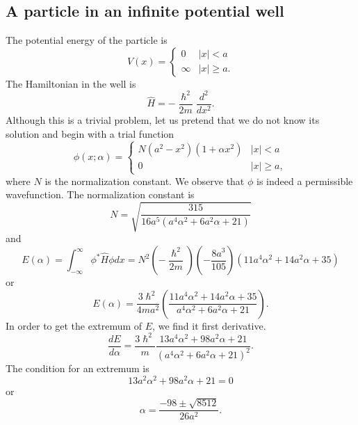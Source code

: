 \documentclass{article}
\numberwithin{equation}{section}
\begin{document}
\subsection{A particle in an infinite potential well}
The potential energy of the particle is
\begin{equation}\label{s5e12}
V(x) = \begin{cases}
0 & |x| < a \\
\infty & |x| \ge a.
\end{cases}
\end{equation}
The Hamiltonian in the well is
\begin{equation}\label{s5e13}
\hat{H} = -\frac{\hslash^2}{2m}\frac{d^2}{dx^2}.
\end{equation}
Although this is a trivial problem, let us pretend that we do not know
its solution and begin with a trial function
\begin{equation}\label{s5e14}
\phi(x;\alpha) = \begin{cases}
N(a^2 - x^2)(1 + \alpha x^2) & |x| < a \\
0 & |x| \ge a,
\end{cases}
\end{equation}
where $N$ is the normalization constant. We observe that $\phi$ is indeed a 
permissible wavefunction. The normalization constant is
\begin{equation}\label{s5e15}
N = \sqrt{\frac{315}{16 a^5(a^4\alpha^2 + 6a^2\alpha + 21)}}
\end{equation}
and
\begin{equation}\label{s5e16}
E(\alpha) = \int_{-\infty}^\infty \phi^\ast\hat{H}\phi dx = 
N^2 \left(-\frac{\hslash^2}{2m}\right)\left(-\frac{8a^3}{105}\right)
(11a^4\alpha^2 + 14a^2\alpha + 35)
\end{equation}
or
\begin{equation}\label{s5e17}
E(\alpha) = \frac{3\hslash^2}{4ma^2}
\left(\frac{11a^4\alpha^2+14a^2\alpha+35}{a^4\alpha^2+6a^2\alpha+21}\right).
\end{equation}
In order to get the extremum of $E$, we find it first derivative.
\begin{equation}\label{s5e18}
\frac{dE}{d\alpha} = \frac{3\hslash^2}{m}
\frac{13a^4\alpha^2 + 98 a^2\alpha + 21}{(a^4\alpha^2+6a^2\alpha+21)^2}.
\end{equation}
The condition for an extremum is
\begin{equation}\label{s5e19}
13a^2\alpha^2 + 98 a^2\alpha + 21 = 0
\end{equation}
or
\begin{equation}\label{s5e20}
\alpha = \frac{-98 \pm \sqrt{8512}}{26a^2}.
\end{equation}
\end{document}
